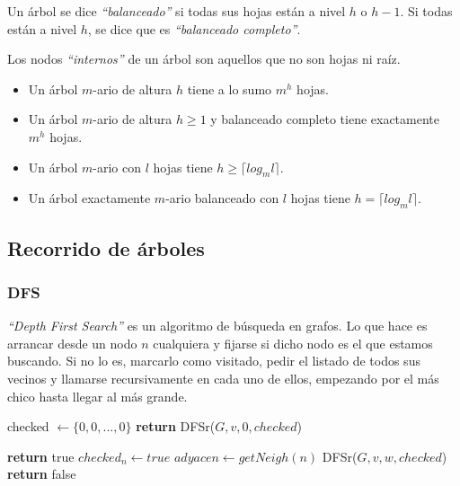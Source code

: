 Un \'arbol se dice \emph{``balanceado''} si todas sus hojas est\'an a nivel $h$ o $h-1$. Si todas est\'an a nivel $h$, se dice que es \emph{``balanceado completo''}.

Los nodos \emph{``internos''} de un \'arbol son aquellos que no son hojas ni ra\'iz.

\begin{itemize}
\item Un \'arbol $m$-ario de altura $h$ tiene a lo sumo $m^h$ hojas. 
\item Un \'arbol $m$-ario de altura $h \geq 1$ y balanceado completo tiene exactamente $m^h$ hojas.
\item Un \'arbol $m$-ario con $l$ hojas tiene $h \geq \lceil log_{m}l \rceil$.
\item Un \'arbol exactamente $m$-ario balanceado con $l$ hojas tiene $h = \lceil log_{m}l \rceil$.
\end{itemize}

\subsection{Recorrido de \'arboles}
\subsubsection{DFS}

\emph{``Depth First Search''} es un algoritmo de b\'usqueda en grafos. Lo que hace es arrancar desde un nodo $n$ cualquiera y fijarse si dicho nodo es el que estamos buscando. Si no lo es, marcarlo como visitado, pedir el listado de todos sus vecinos y llamarse recursivamente en cada uno de ellos, empezando por el m\'as chico hasta llegar al m\'as grande.
\vspace{8px}

\begin{algorithm}
\begin{algorithmic}[1]
  \State checked $\gets \{0, 0, ..., 0\}$
  \State \textbf{return} DFSr($G, v, 0, checked$)
\EndFunction
\end{algorithmic}
\end{algorithm}



\begin{algorithm}
\begin{algorithmic}[1]
    \State \textbf{return} true
  \EndIf
  \State $checked_n \gets true$
  \State $adyacen \gets getNeigh(n)$
      \State DFSr($G, v, w, checked$)
    \EndIf
  \EndFor
  \State \textbf{return} false
\EndFunction
\end{algorithmic}
\end{algorithm}

